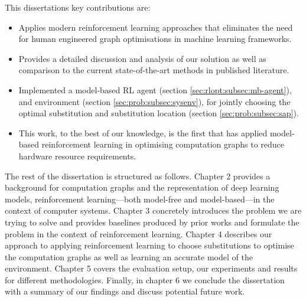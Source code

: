 This dissertations key contributions are:

\begin{itemize}
  \item Applies modern reinforcement learning approaches that eliminates the need for human engineered graph optimisations in machine learning frameworks.
  \item Provides a detailed discussion and analysis of our solution as well as comparison to the current state-of-the-art methods in published literature.
  \item Implemented a model-based RL agent (section \ref{sec:rlopt:subsec:mb-agent}), and environment (section \ref{sec:prob:subsec:sysenv}), for jointly choosing the optimal substitution and substitution location (section \ref{sec:prob:subsec:sap}).
  \item This work, to the best of our knowledge, is the first that has applied model-based reinforcement learning in optimising computation graphs to reduce hardware resource requirements.
\end{itemize}

The rest of the dissertation is structured as follows. Chapter 2 provides a background for computation graphs and the representation of deep learning models, reinforcement learning---both model-free and model-based---in the context of computer systems. Chapter 3 concretely introduces the problem we are trying to solve and provides baselines produced by prior works and formulate the problem in the context of reinforcement learning. Chapter 4 describes our approach to applying reinforcement learning to choose substitutions to optimise the computation graphs as well as learning an accurate model of the environment. Chapter 5 covers the evaluation setup, our experiments and results for different methodologies. Finally, in chapter 6 we conclude the dissertation with a summary of our findings and discuss potential future work.